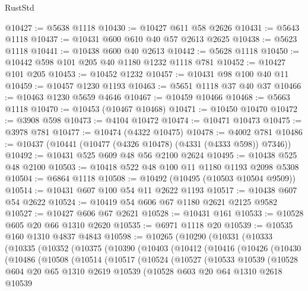 \begin{lexlean}{RustStd}
\begin{coremodule}
@10427 := @5638 @1118
@10430 := @10427 @611 @58 @2626
@10431 := @5643 @1118
@10437 := @10431 @600 @610 @40 @57 @2613 @2625
@10438 := @5623 @1118
@10441 := @10438 @600 @40 @2613
@10442 := @5628 @1118
@10450 := @10442 @598 @101 @205 @40 @1180 @1232 @1118 @781
@10452 := @10427 @101 @205
@10453 := @10452 @1232
@10457 := @10431 @98 @100 @40 @11
@10459 := @10457 @1230 @1193
@10463 := @5651 @1118 @37 @40 @37
@10466 := @10463 @1230 @5659 @4646
@10467 := @10459 @10466
@10468 := @5663 @1118
@10470 := @10453 (@10467 @10468)
@10471 := @10450 @10470
@10472 := @3908 @598
@10473 := @4104 @10472
@10474 := @10471 @10473
@10475 := @3978 @781
@10477 := @10474 (@4322 @10475)
@10478 := @4002 @781
@10486 := @10437 (@10441 (@10477 (@4326 @10478) (@4331 (@4333 @598)) @7346))
@10492 := @10431 @525 @609 @48 @56 @2100 @2624
@10495 := @10438 @525 @48 @2100
@10503 := @10418 @522 @48 @100 @11 @1180 @1193 @2098 @5308
@10504 := @6864 @1118
@10508 := @10492 (@10495 (@10503 @10504 @9509))
@10514 := @10431 @607 @100 @54 @11 @2622 @1193
@10517 := @10438 @607 @54 @2622
@10524 := @10419 @54 @606 @67 @1180 @2621 @2125 @9582
@10527 := @10427 @606 @67 @2621
@10528 := @10431 @161
@10533 := @10528 @605 @20 @66 @1310 @2620
@10535 := @6971 @1118 @20
@10539 := @10535 @160 @1310 @4837 @4843
@10598 := @10265
    (@10290
      (@10331
        (@10333
          (@10335
            (@10352
              (@10375
                (@10390
                  (@10403
                    (@10412
                      (@10416
                        (@10426
                          (@10430
                            (@10486
                              (@10508
                                (@10514
                                  (@10517
                                    (@10524
                                      (@10527
                                        (@10533
                                          @10539
                                          (@10528
                                            @604
                                            @20
                                            @65
                                            @1310
                                            @2619
                                            @10539
                                            (@10528
                                              @603
                                              @20
                                              @64
                                              @1310
                                              @2618
                                              @10539

\end{coremodule}
\end{lexlean}
